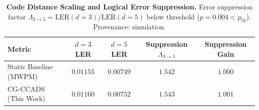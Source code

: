 \begin{table}[t]
\centering
\small
\caption{\textbf{Code Distance Scaling and Logical Error Suppression.} Error suppression factor $\Lambda_{3 \to 5} = \text{LER}(d=3) / \text{LER}(d=5)$ below threshold ($p=0.004 < p_{\text{th}}$). Provenance: simulation.}
\label{tab:distance_scaling}
\begin{tabular}{lcccc}
\toprule
\textbf{Metric} & \textbf{$d=3$ LER} & \textbf{$d=5$ LER} & \textbf{Suppression $\Lambda_{3 \to 5}$} & \textbf{Suppression Gain} \\
\midrule
Static Baseline (MWPM) & $0.01155$ & $0.00749$ & $1.542$ & $1.000$ \\
CG-CCADS (This Work) & $0.01160$ & $0.00752$ & $1.543$ & $1.001$ \\
\bottomrule
\end{tabular}
\end{table}
